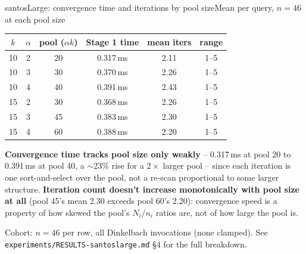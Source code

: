 \documentclass[aspectratio=169,10pt]{beamer}
\newcommand{\highlight}[1]{{\color{Cat1}\bfseries #1}}
\begin{document}
\begin{frame}{santosLarge: convergence time and iterations by pool size}{Mean per query, $n=46$ at each pool size}
\small
\begin{center}
\begin{tabular}{cccccc}
\toprule
$k$ & $\alpha$ & pool ($\alpha k$) & Stage 1 time & mean iters & range \\
\midrule
10 & 2 & 20 & 0.317\,ms & 2.11 & 1--5 \\
10 & 3 & 30 & 0.370\,ms & 2.26 & 1--5 \\
10 & 4 & 40 & 0.391\,ms & 2.43 & 1--5 \\
15 & 2 & 30 & 0.368\,ms & 2.26 & 1--5 \\
15 & 3 & 45 & 0.383\,ms & 2.30 & 1--5 \\
15 & 4 & 60 & 0.388\,ms & 2.20 & 1--5 \\
\bottomrule
\end{tabular}
\end{center}

\vspace{4pt}
\small\color{Ink2}
\highlight{Convergence time tracks pool size only weakly} -- 0.317\,ms at pool 20 to 0.391\,ms at pool 40, a $\sim$23\% rise for a $2\times$ larger pool -- since each iteration is one sort-and-select over the pool, not a re-scan proportional to some larger structure. \highlight{Iteration count doesn't increase monotonically with pool size at all} (pool 45's mean 2.30 exceeds pool 60's 2.20): convergence speed is a property of how skewed the pool's $N_i/n_i$ ratios are, not of how large the pool is.

\vspace{2pt}
{\footnotesize\color{Muted} Cohort: $n=46$ per row, all Dinkelbach invocations (none clamped). See \texttt{experiments/RESULTS-santoslarge.md} \S4 for the full breakdown.}
\end{frame}
\end{document}
